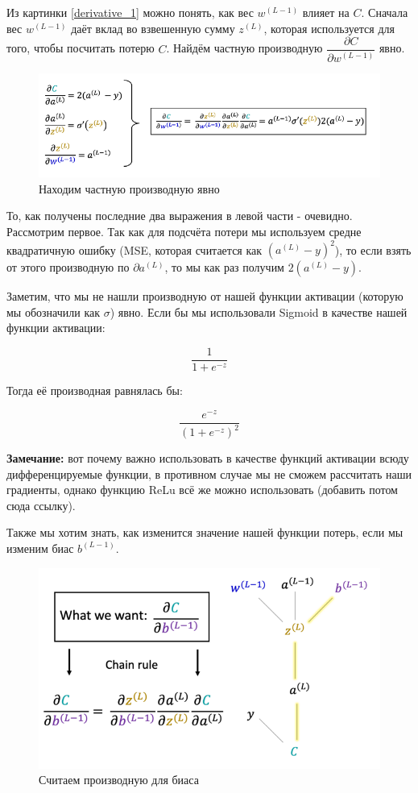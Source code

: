 \documentclass[a4paper, 10pt, openany]{book} %
\begin{document}
	Из картинки \ref{derivative_1} можно понять, как вес $w^{(L-1)}$ влияет на $C$. Сначала вес $w^{(L-1)}$ даёт вклад во взвешенную сумму $z^{(L)}$, которая используется для того, чтобы посчитать потерю $C$. Найдём частную производную $\dfrac{\partial C}{\partial w^{(L-1)}}$ явно.
	
	\begin{figure}[h!]
		\centering
		\includegraphics[width=\linewidth]{pictures/backpropagation/derivative_itself.png}
		\caption{Находим частную производную явно}
		\label{derivative_itself_weight}
	\end{figure}
	
	То, как получены последние два выражения в левой части - очевидно. Рассмотрим первое. Так как для подсчёта потери мы используем средне квадратичную ошибку (MSE, которая считается как $(a^{(L)}-y)^2$), то если взять от этого производную по $\partial a^{(L)}$, то мы как раз получим $2(a^{(L)}-y)$.
	
	Заметим, что мы не нашли производную от нашей функции активации (которую мы обозначили как $\sigma$) явно. Если бы мы использовали Sigmoid в качестве нашей функции активации:
	
	\[\dfrac{1}{1+e^{-z}}\]
	
	Тогда её производная равнялась бы:
	
	\[\dfrac{e^{-z}}{(1+e^{-z})^2}\]
	
	\textbf{Замечание:} вот почему важно использовать в качестве функций активации всюду дифференцируемые функции, в противном случае мы не сможем рассчитать наши градиенты, однако функцию ReLu всё же можно использовать (добавить потом сюда ссылку).
	
	Также мы хотим знать, как изменится значение нашей функции потерь, если мы изменим биас $b^{(L-1)}$.
	
	\begin{figure}[h!]
		\centering
		\includegraphics[width=\linewidth]{pictures/backpropagation/bias.png}
		\caption{Считаем производную для биаса}
		\label{derivative_bias}
	\end{figure}
	
\end{document}
